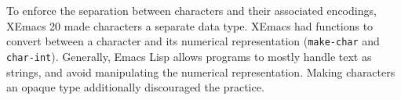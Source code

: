 \documentclass[format=acmsmall, review=false, screen=true]{acmart}
\begin{document}
To enforce the separation between characters and their associated
encodings, XEmacs 20 made characters a separate data type.  XEmacs had
functions to convert between a character and its numerical
representation (\texttt{make-char} and \texttt{char-int}).  Generally,
Emacs Lisp allows programs to mostly handle text as strings,
and avoid manipulating the numerical representation.  Making
characters an opaque type additionally discouraged the practice.











\end{document}
